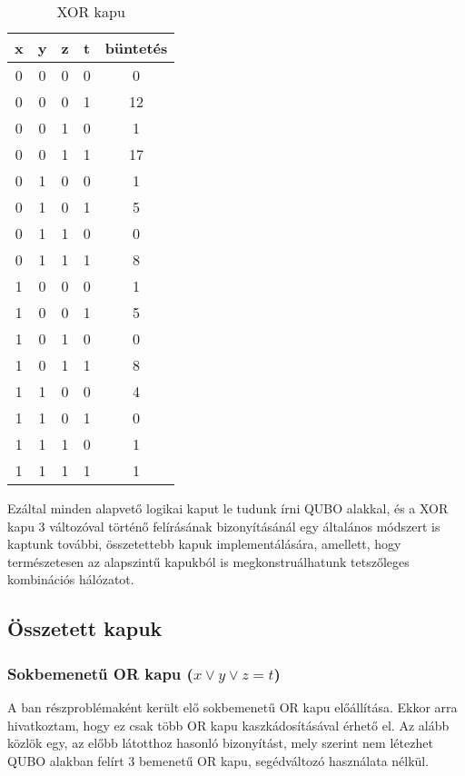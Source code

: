 \begin{table}[ht]
	\footnotesize
	\centering
	\begin{tabular}{ c c c c c }
		\toprule
		x & y & z & t & büntetés \\
		\midrule
		0 & 0 & 0 & 0 & 0 \\
		0 & 0 & 0 & 1 & 12 \\
		0 & 0 & 1 & 0 & 1 \\
		0 & 0 & 1 & 1 & 17 \\
		0 & 1 & 0 & 0 & 1 \\
		0 & 1 & 0 & 1 & 5 \\
		0 & 1 & 1 & 0 & 0 \\
		0 & 1 & 1 & 1 & 8 \\		
		1 & 0 & 0 & 0 & 1 \\
		1 & 0 & 0 & 1 & 5 \\
		1 & 0 & 1 & 0 & 0 \\
		1 & 0 & 1 & 1 & 8 \\
		1 & 1 & 0 & 0 & 4 \\
		1 & 1 & 0 & 1 & 0 \\
		1 & 1 & 1 & 0 & 1 \\
		1 & 1 & 1 & 1 & 1 \\		
		\bottomrule
	\end{tabular}
	\caption{XOR kapu}
	\label{tab:XORgate}
\end{table}

Ezáltal minden alapvető logikai kaput le tudunk írni QUBO alakkal, és a XOR kapu 3 változóval történő felírásának bizonyításánál egy általános módszert is kaptunk további, összetettebb kapuk implementálására, amellett, hogy természetesen az alapszintű kapukból is megkonstruálhatunk tetszőleges kombinációs hálózatot.

\subsection{Összetett kapuk}

\subsubsection{Sokbemenetű OR kapu ($x \vee y \vee z = t$)} \label{sec:MORgate}

A ban részproblémaként került elő sokbemenetű OR kapu előállítása. Ekkor arra hivatkoztam, hogy ez csak több OR kapu kaszkádosításával érhető el. Az alább közlök egy, az előbb látotthoz hasonló bizonyítást, mely szerint nem létezhet QUBO alakban felírt 3 bemenetű OR kapu, segédváltozó használata nélkül.

